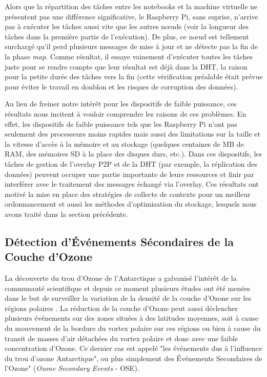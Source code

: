 Alors que la répartition des tâches entre les notebooks et la machine virtuelle ne présentent pas une différence significative, le Raspberry Pi, sans suprise, n'arrive pas à exécuter les tâches aussi vite que les autres n{\oe}uds (voir la longueur des tâches dans la première partie de l'exécution). De plus, ce n{\oe}ud est tellement surchargé qu'il perd plusieurs messages de mise à jour et ne détecte pas la fin de la phase \textit{map}. Comme résultat, il essaye vainement d'exécuter toutes les tâches juste pour se rendre compte que leur résultat est déjà dans la DHT, la raison pour la petite durée des tâches vers la fin (cette vérification préalable était prévue pour éviter le travail en doublon et les risques de corruption des données). 

Au lieu de freiner notre intérêt pour les dispositifs de faible puissance, ces résultats nous incitent à vouloir comprendre les raisons de ces problèmes. En effet, les dispositifs de faible puissance tels que les Raspberry Pi n'ont pas seulement des processeurs moins rapides mais aussi des limitations sur la taille et la vitesse d'accès à la mémoire et au stockage (quelques centaines de MB de RAM, des mémoires SD à la place des disques durs, etc.). Dans ces dispositifs, les tâches de gestion de l'overlay P2P et de la DHT (par exemple, la réplication des données) peuvent occuper une partie importante de leurs ressources et finir par interférer avec le traitement des messages échangé via l'overlay.  Ces résultats ont motivé la mise en place des stratégies de collecte de contexte pour un meilleur ordonnancement et aussi les méthodes d'optimisation du stockage, lesquels nous avons traité dans la section précédente. 

\subsection{Détection d'Événements Sécondaires de la Couche d'Ozone}

La découverte du trou d'Ozone de l'Antarctique \cite{Farman1985} a galvanisé l'intérêt de la communauté scientifique et depuis ce moment plusieurs études ont été menées dans le but de surveiller la variation de la densité de la couche d'Ozone sur les régions polaires \cite{Solomon1999}\cite{Salby2012}. La réduction de la couche d'Ozone peut aussi déclencher plusieurs événements sur des zones situées à des latitudes moyennes, soit à cause du mouvement de la bordure du vortex polaire sur ces régions  \cite{Kirchhoff1997}\cite{Marchand2005} ou bien à cause du transit de masses d'air détachées du vortex polaire et donc avec une faible concentration d'Ozone. Ce dernier cas est appelé "les événements dus à l'influence du trou d'ozone Antarctique", ou plus simplement des Événements Secondaires de l'Ozone" (\textit{Ozone Secondary Events}  - OSE). 

